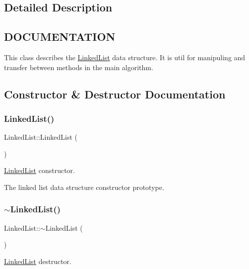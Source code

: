 \subsection{Detailed Description}
\hypertarget{classScreen_CLASS}{}\subsection{D\+O\+C\+U\+M\+E\+N\+T\+A\+T\+I\+ON}\label{classScreen_CLASS}
This class describes the \hyperlink{classLinkedList}{Linked\+List} data structure. It is util for manipuling and transfer between methods in the main algorithm. 

\subsection{Constructor \& Destructor Documentation}
\mbox{\label{classLinkedList_afe7f78983e173f8018927cf2ad11a5aa}} 
\subsubsection{\texorpdfstring{Linked\+List()}{LinkedList()}}
{\footnotesize\ttfamily Linked\+List\+::\+Linked\+List (\begin{DoxyParamCaption}{ }\end{DoxyParamCaption})}



\hyperlink{classLinkedList}{Linked\+List} constructor. 

The linked list data structure constructor prototype. \mbox{\label{classLinkedList_a35811ed58ff0d8d9cc9b309b8d8f5111}} 
\subsubsection{\texorpdfstring{$\sim$\+Linked\+List()}{~LinkedList()}}
{\footnotesize\ttfamily Linked\+List\+::$\sim$\+Linked\+List (\begin{DoxyParamCaption}{ }\end{DoxyParamCaption})}



\hyperlink{classLinkedList}{Linked\+List} destructor. 

